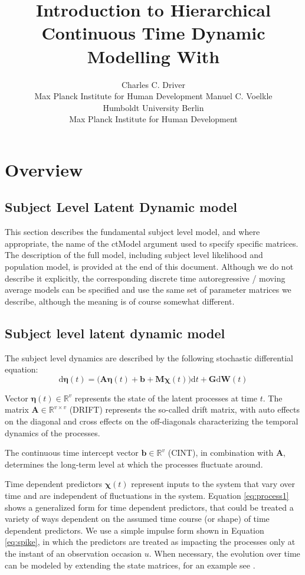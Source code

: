 \documentclass[nojss]{jss}\usepackage[]{graphicx}\usepackage[]{color}
\author{Charles C. Driver \\ Max Planck Institute for Human Development \And 
Manuel C. Voelkle \\ Humboldt University Berlin \\ Max Planck Institute for Human Development}
\title{Introduction to Hierarchical Continuous Time Dynamic Modelling With \pkg{ctsem}}
\newcommand{\vect}[1]{\boldsymbol{\mathbf{#1}}}
\begin{document}
\section{Overview}


\subsection{Subject Level Latent Dynamic model}
This section describes the fundamental subject level model, and where appropriate, the name of the ctModel argument used to specify specific matrices. The description of the full model, including subject level likelihood and population model, is provided at the end of this document. Although we do not describe it explicitly, the corresponding discrete time autoregressive / moving average models can be specified and use the same set of parameter matrices we describe, although the meaning is of course somewhat different.

\subsection{Subject level latent dynamic model}
The subject level dynamics are described by the following stochastic differential equation:
\begin{equation}
\label{eq:process1}
\mathrm{d} \vect{\eta} (t) =
\bigg( 
\vect{A \eta} (t) +
\vect{b} +
\vect{M \chi} (t)  
\bigg) \mathrm{d} t +
\vect{G} \mathrm{d} \vect{W}(t)  
\end{equation}

Vector $ \vect{\eta} (t)\in\mathbb{R}^{v}$ represents the state of the latent processes at time $t$. The matrix $ \vect{A} \in \mathbb{R}^{v \times v}$ (DRIFT) represents the so-called drift matrix, with auto effects on the diagonal and cross effects on the off-diagonals characterizing the temporal dynamics of the processes. 

The continuous time intercept vector $ \vect{b} \in\mathbb{R}^{v}$ (CINT), in combination with $\vect{A}$, determines the long-term level at which the processes fluctuate around.

Time dependent predictors $\vect{\chi}(t)$ represent inputs to the system that vary over time and are independent of fluctuations in the system. Equation \ref{eq:process1} shows a generalized form for time dependent predictors, that could be treated a variety of ways dependent on the assumed time course (or shape) of time dependent predictors. We use a simple impulse form shown in Equation \ref{eq:spike}, in which the predictors are treated as impacting the processes only at the instant of an observation occasion $u$. When necessary, the evolution over time can be modeled by extending the state matrices, for an example see \citet{driverinpresscontinuous}.
\end{document}
